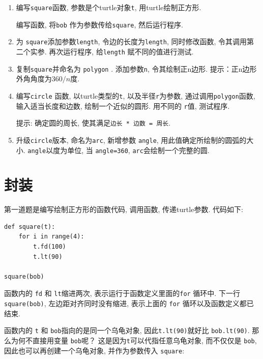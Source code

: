 \documentclass[10pt]{book}
\begin{document}
\begin{enumerate}

\item 编写{\tt square}函数, 参数是个turtle对象{\tt t}, 用turtle绘制正方形. 

编写函数, 将{\tt bob} 作为参数传给{\tt square}, 然后运行程序. 

\item 为 {\tt square}添加参数{\tt length}, 令边的长度为{\tt length}, 
同时修改函数, 令其调用第二个实参. 再次运行程序, 给{\tt length} 赋不同的值进行测试. 

\item 复制{\tt square}并命名为 {\tt polygon} . 添加参数{\tt n},
令其绘制正n边形. 提示：正n边形外角角度为$360/n$度. 

\item 编写{\tt circle} 函数, 以turtle类型的{\tt t}, 以及半径{\tt r}为参数, 
通过调用{\tt polygon}函数, 输入适当长度和边数, 绘制一个近似的圆形. 
用不同的 {\tt r}值, 测试程序.  

提示: 确定圆的周长, 使其满足{\tt 边长 * 边数 = 周长}.

\item 升级{\tt circle}版本, 命名为{\tt arc}, 新增参数 {\tt angle}, 
用此值确定所绘制的圆弧的大小. 
 {\tt angle}以度为单位, 当 {\tt angle=360}, {\tt arc}会绘制一个完整的圆. 

\end{enumerate}


\section{封装}

第一道题是编写绘制正方形的函数代码, 调用函数, 传递turtle参数. 
代码如下:

\begin{verbatim}
def square(t):
    for i in range(4):
        t.fd(100)
        t.lt(90)

square(bob)
\end{verbatim}
%
函数内的 {\tt fd} 和 {\tt lt}缩进两次, 表示运行于函数定义里面的{\tt for} 循环中. 
下一行 {\tt square(bob)}, 左边距对齐同时没有缩进, 
表示上面的 {\tt for} 循环以及函数定义都已结束. 

函数内的 {\tt t} 和 {\tt bob}指向的是同一个乌龟对象, 
因此{\tt t.lt(90)}就好比 {\tt bob.lt(90)}. 
那么为何不直接用变量 {\tt bob}呢？
这是因为{\tt t}可以代指任意乌龟对象, 而不仅仅是 {\tt bob}, 
因此也可以再创建一个乌龟对象, 并作为参数传入 {\tt square}:
\end{document}
